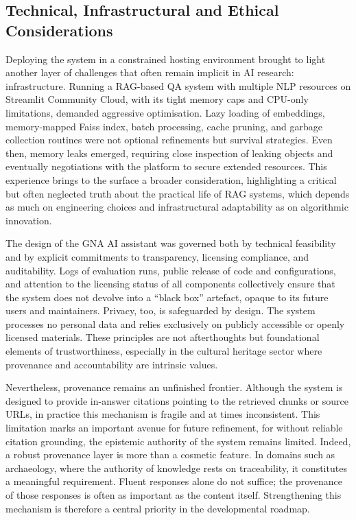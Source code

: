 \begin{spacing}{1.5}
\section{Technical, Infrastructural and Ethical Considerations}
Deploying the system in a constrained hosting environment brought to light another layer of challenges that often remain implicit in AI research: infrastructure. Running a RAG-based QA system with multiple NLP resources on Streamlit Community Cloud, with its tight memory caps and CPU-only limitations, demanded aggressive optimisation. Lazy loading of embeddings, memory-mapped Faiss index, batch processing, cache pruning, and garbage collection routines were not optional refinements but survival strategies. Even then, memory leaks emerged, requiring close inspection of leaking objects and eventually negotiations with the platform to secure extended resources. This experience brings to the surface a broader consideration, highlighting a critical but often neglected truth about the practical life of RAG systems, which depends as much on engineering choices and infrastructural adaptability as on algorithmic innovation.

The design of the GNA AI assistant was governed both by technical feasibility and by explicit commitments to transparency, licensing compliance, and auditability. Logs of evaluation runs, public release of code and configurations, and attention to the licensing status of all components collectively ensure that the system does not devolve into a ``black box'' artefact, opaque to its future users and maintainers. Privacy, too, is safeguarded by design. The system processes no personal data and relies exclusively on publicly accessible or openly licensed materials. These principles are not afterthoughts but foundational elements of trustworthiness, especially in the cultural heritage sector where provenance and accountability are intrinsic values.

Nevertheless, provenance remains an unfinished frontier. Although the system is designed to provide in-answer citations pointing to the retrieved chunks or source URLs, in practice this mechanism is fragile and at times inconsistent. This limitation marks an important avenue for future refinement, for without reliable citation grounding, the epistemic authority of the system remains limited. Indeed, a robust provenance layer is more than a cosmetic feature. In domains such as archaeology, where the authority of knowledge rests on traceability, it constitutes a meaningful requirement. Fluent responses alone do not suffice; the provenance of those responses is often as important as the content itself. Strengthening this mechanism is therefore a central priority in the developmental roadmap.


\end{spacing}
